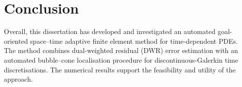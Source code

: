 \section{Conclusion}

Overall, this dissertation has developed and investigated an automated goal-oriented space--time adaptive finite element method for time-dependent PDEs. The method combines dual-weighted residual (DWR) error estimation with an automated bubble--cone localisation procedure for discontinuous-Galerkin time discretisations. The numerical results support the feasibility and utility of the approach.

